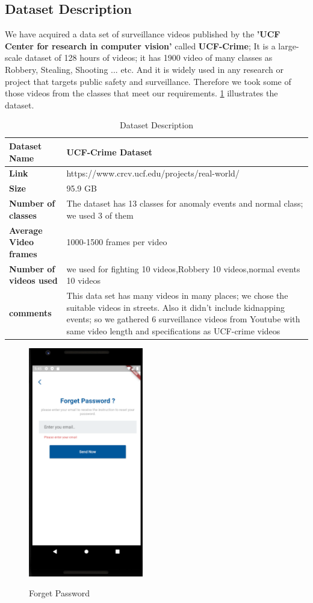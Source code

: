 \documentclass[12pt]{article}
\begin{document}
\subsection{Dataset Description}
We have acquired a data set of surveillance videos published by the \textbf{ 'UCF Center for research in computer vision'} called  \textbf{ UCF-Crime}; It is a large-scale dataset of 128 hours of videos; it has 1900 video of many classes as Robbery, Stealing, Shooting ... etc. And it is widely used in any research or project that targets public safety and surveillance. Therefore we took some of those videos from the classes that meet our requirements. \ref{tab:ds} illustrates the dataset.

\FloatBarrier
\begin{table}[htbp]
\centering
\label{tab:ds}
\caption{Dataset Description}
\begin{tabular}{ | l | m{11cm}|} 
\hline
\textbf{Dataset Name} & UCF-Crime Dataset   \\ 
\hline
\textbf{Link} &  https://www.crcv.ucf.edu/projects/real-world/ \\ 
\hline
\textbf{Size} & 95.9 GB  \\ 
\hline
\textbf{Number of classes} & The dataset has 13 classes for anomaly events and normal class; we used 3 of them  \\
\hline
\textbf{Average Video frames} & 1000-1500 frames per video \\
\hline
\textbf{Number of videos used} & we used for fighting 10 videos,Robbery 10 videos,normal events 10 videos \\
\hline
\textbf{comments} & This data set has many videos in many places; we chose the suitable videos in streets. Also it didn't include kidnapping events; so we gathered 6 surveillance videos from Youtube with same video length and specifications as UCF-crime videos \\
\hline
\end{tabular}
\end{table}
 \FloatBarrier
\begin{figure}[h]
  \centering
  \includegraphics[width=5cm]{ForgetPass.PNG}
  \label{fig:2}
   \caption{Forget Password}
\end{figure}
\end{document}
